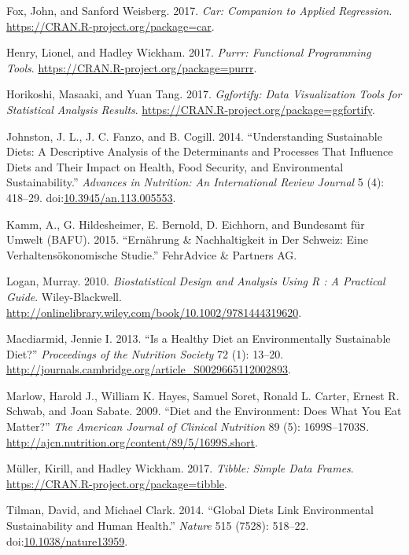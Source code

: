 \documentclass[]{book}
\begin{document}
\hypertarget{ref-R-car}{}
Fox, John, and Sanford Weisberg. 2017. \emph{Car: Companion to Applied
Regression}. \url{https://CRAN.R-project.org/package=car}.

\hypertarget{ref-R-purrr}{}
Henry, Lionel, and Hadley Wickham. 2017. \emph{Purrr: Functional
Programming Tools}. \url{https://CRAN.R-project.org/package=purrr}.

\hypertarget{ref-R-ggfortify}{}
Horikoshi, Masaaki, and Yuan Tang. 2017. \emph{Ggfortify: Data
Visualization Tools for Statistical Analysis Results}.
\url{https://CRAN.R-project.org/package=ggfortify}.

\hypertarget{ref-johnston_understanding_2014}{}
Johnston, J. L., J. C. Fanzo, and B. Cogill. 2014. ``Understanding
Sustainable Diets: A Descriptive Analysis of the Determinants and
Processes That Influence Diets and Their Impact on Health, Food
Security, and Environmental Sustainability.'' \emph{Advances in
Nutrition: An International Review Journal} 5 (4): 418--29.
doi:\href{https://doi.org/10.3945/an.113.005553}{10.3945/an.113.005553}.

\hypertarget{ref-kamm_ernahrung_2015}{}
Kamm, A., G. Hildesheimer, E. Bernold, D. Eichhorn, and Bundesamt für
Umwelt (BAFU). 2015. ``Ernährung \& Nachhaltigkeit in Der Schweiz: Eine
Verhaltensökonomische Studie.'' FehrAdvice \& Partners AG.

\hypertarget{ref-logan2010}{}
Logan, Murray. 2010. \emph{Biostatistical Design and Analysis Using R :
A Practical Guide}. Wiley-Blackwell.
\url{http://onlinelibrary.wiley.com/book/10.1002/9781444319620}.

\hypertarget{ref-macdiarmid_is_2013}{}
Macdiarmid, Jennie I. 2013. ``Is a Healthy Diet an Environmentally
Sustainable Diet?'' \emph{Proceedings of the Nutrition Society} 72 (1):
13--20. \url{http://journals.cambridge.org/article_S0029665112002893}.

\hypertarget{ref-marlow_diet_2009}{}
Marlow, Harold J., William K. Hayes, Samuel Soret, Ronald L. Carter,
Ernest R. Schwab, and Joan Sabate. 2009. ``Diet and the Environment:
Does What You Eat Matter?'' \emph{The American Journal of Clinical
Nutrition} 89 (5): 1699S--1703S.
\url{http://ajcn.nutrition.org/content/89/5/1699S.short}.

\hypertarget{ref-R-tibble}{}
Müller, Kirill, and Hadley Wickham. 2017. \emph{Tibble: Simple Data
Frames}. \url{https://CRAN.R-project.org/package=tibble}.

\hypertarget{ref-tilman_global_2014}{}
Tilman, David, and Michael Clark. 2014. ``Global Diets Link
Environmental Sustainability and Human Health.'' \emph{Nature} 515
(7528): 518--22.
doi:\href{https://doi.org/10.1038/nature13959}{10.1038/nature13959}.
\end{document}
